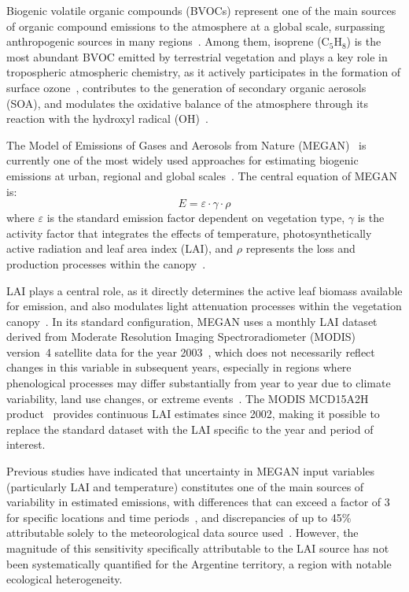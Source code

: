 \documentclass[conference,a4paper]{IEEEtran}   %
\begin{document}
\IEEEpubidadjcol   %
Biogenic volatile organic compounds (BVOCs) represent one of the main sources of organic compound emissions to the atmosphere at a global scale, surpassing anthropogenic sources in many regions~\cite{guenther2006,sindelarova2014}. Among them, isoprene (C$_5$H$_8$) is the most abundant BVOC emitted by terrestrial vegetation and plays a key role in tropospheric atmospheric chemistry, as it actively participates in the formation of surface ozone~\cite{carlton2009}, contributes to the generation of secondary organic aerosols (SOA), and modulates the oxidative balance of the atmosphere through its reaction with the hydroxyl radical (OH)~\cite{atkinson2003,khan2025}.

The Model of Emissions of Gases and Aerosols from Nature (MEGAN)~\cite{guenther2012} is currently one of the most widely used approaches for estimating biogenic emissions at urban, regional and global scales~\cite{sun2025,kaser2022,wei2024,bauwens2018}. The central equation of MEGAN is:
\begin{equation}
E = \varepsilon \cdot \gamma \cdot \rho
\label{eq:megan}
\end{equation}
where $\varepsilon$ is the standard emission factor dependent on vegetation type, $\gamma$ is the activity factor that integrates the effects of temperature, photosynthetically active radiation and leaf area index (LAI), and $\rho$ represents the loss and production processes within the canopy~\cite{guenther2012,guenther2020}.

LAI plays a central role, as it directly determines the active leaf biomass available for emission, and also modulates light attenuation processes within the vegetation canopy~\cite{zhang2004}. In its standard configuration, MEGAN uses a monthly LAI dataset derived from Moderate Resolution Imaging Spectroradiometer (MODIS) version~4 satellite data for the year 2003~\cite{guenther1993}, which does not necessarily reflect changes in this variable in subsequent years, especially in regions where phenological processes may differ substantially from year to year due to climate variability, land use changes, or extreme events~\cite{opacka2021,zhu2016,richardson2013}. The MODIS MCD15A2H product~\cite{myneni2021} provides continuous LAI estimates since 2002, making it possible to replace the standard dataset with the LAI specific to the year and period of interest.

Previous studies have indicated that uncertainty in MEGAN input variables (particularly LAI and temperature) constitutes one of the main sources of variability in estimated emissions, with differences that can exceed a factor of 3 for specific locations and time periods~\cite{guenther2006}, and discrepancies of up to 45\% attributable solely to the meteorological data source used~\cite{dimaria2023}. However, the magnitude of this sensitivity specifically attributable to the LAI source has not been systematically quantified for the Argentine territory, a region with notable ecological heterogeneity.
\end{document}
